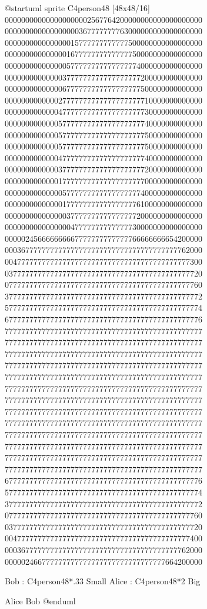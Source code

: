 \documentclass[letterpaper,10pt,english]{sphinxmanual}
\begin{document}
%
\begin{sphinxVerbatim}[commandchars=\\\{\},numbers=left,firstnumber=1,stepnumber=1]
@startuml
sprite \PYGZdl{}C4person48 [48x48/16] \PYGZob{}
000000000000000000002567764200000000000000000000
000000000000000000367777777763000000000000000000
000000000000000015777777777777500000000000000000
000000000000000167777777777777750000000000000000
000000000000000577777777777777774000000000000000
000000000000003777777777777777777200000000000000
000000000000006777777777777777777500000000000000
000000000000027777777777777777777710000000000000
000000000000047777777777777777777730000000000000
000000000000057777777777777777777740000000000000
000000000000057777777777777777777750000000000000
000000000000057777777777777777777750000000000000
000000000000047777777777777777777740000000000000
000000000000037777777777777777777720000000000000
000000000000017777777777777777777700000000000000
000000000000005777777777777777777400000000000000
000000000000001777777777777777776100000000000000
000000000000000377777777777777772000000000000000
000000000000000047777777777777730000000000000000
000002456666666667777777777777766666666654200000
000367777777777777777777777777777777777777762000
004777777777777777777777777777777777777777777300
037777777777777777777777777777777777777777777720
077777777777777777777777777777777777777777777760
377777777777777777777777777777777777777777777772
577777777777777777777777777777777777777777777774
677777777777777777777777777777777777777777777776
777777777777777777777777777777777777777777777777
777777777777777777777777777777777777777777777777
777777777777777777777777777777777777777777777777
777777777777777777777777777777777777777777777777
777777777777777777777777777777777777777777777777
777777777777777777777777777777777777777777777777
777777777777777777777777777777777777777777777777
777777777777777777777777777777777777777777777777
777777777777777777777777777777777777777777777777
777777777777777777777777777777777777777777777777
777777777777777777777777777777777777777777777777
777777777777777777777777777777777777777777777777
777777777777777777777777777777777777777777777777
677777777777777777777777777777777777777777777776
577777777777777777777777777777777777777777777774
377777777777777777777777777777777777777777777772
077777777777777777777777777777777777777777777760
037777777777777777777777777777777777777777777720
004777777777777777777777777777777777777777777400
000367777777777777777777777777777777777777762000
000002466777777777777777777777777777777664200000
\PYGZcb{}




Bob : \PYGZlt{}\PYGZdl{}C4person48*.33\PYGZgt{} Small
Alice : \PYGZlt{}\PYGZdl{}C4person48*2\PYGZgt{} Big

Alice \PYGZhy{}\PYGZgt{} Bob 
@enduml

\end{sphinxVerbatim}
\sphinxresetverbatimhllines
\end{document}

